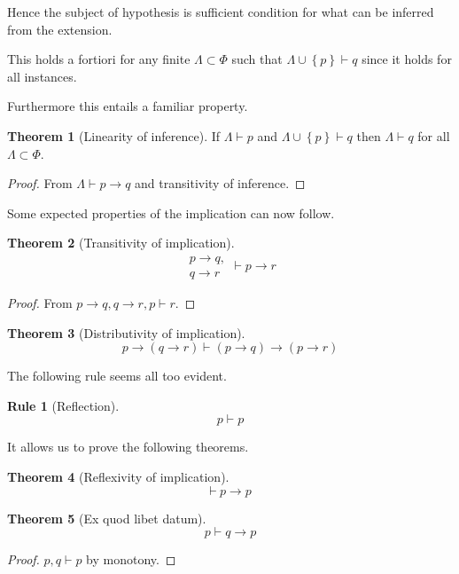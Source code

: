 \documentclass{amsbook}
\newcommand{\setsm}[1]{\left\{#1\right\}}
\newcommand{\infers}{\mathrel\vdash}
\newcommand{\theorem}{\mathord\vdash\medspace}
\newcommand{\then}{\mathrel\rightarrow}
\theoremstyle{definition}
\newtheorem{subrule}{Rule}[subsection]
\newtheorem{thm}{Theorem}[section]
\begin{document}
Hence the subject of hypothesis is sufficient condition for what can be inferred from the extension.

This holds a fortiori for any finite $\varLambda \subset \Phi$ such that $\varLambda \cup \setsm p \infers q$ since it holds for all instances.

Furthermore this entails a familiar property.

\begin{thm}[Linearity of inference]
    If $\varLambda \infers p$ and $\varLambda \cup \setsm p \infers q$ then $\varLambda \infers q$ for all $\varLambda \subset \Phi$.
    \begin{proof}
        From $\varLambda \infers p \then q$ and transitivity of inference.
    \end{proof}
\end{thm}

Some expected properties of the implication can now follow.

\begin{thm}[Transitivity of implication]
    $$\begin{aligned}
            p \then q, \\
            q \then r
        \end{aligned} \infers p \then r$$
    \begin{proof}
        From $p \then q, q \then r, p \infers r$.
    \end{proof}
\end{thm}

\begin{thm}[Distributivity of implication]
    $$p \then (q \then r) \infers (p \then q) \then (p \then r)$$
\end{thm}

The following rule seems all too evident.

\begin{subrule}[Reflection]
    $$p \infers p$$
\end{subrule}

It allows us to prove the following theorems.

\begin{thm}[Reflexivity of implication]
    $$\theorem p \then p$$
\end{thm}

\begin{thm}[Ex quod libet datum]
    $$p \infers q \then p$$
    \begin{proof}
        $p, q \infers p$ by monotony.
    \end{proof}
\end{thm}
\end{document}
